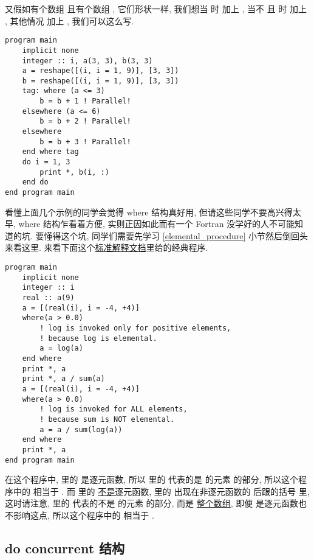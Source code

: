 又假如有个数组  且有个数组 , 它们形状一样, 我们想当  时  加上 , 当不  且  时  加上 , 其他情况  加上 , 我们可以这么写.
\begin{lstlisting}
program main
    implicit none
    integer :: i, a(3, 3), b(3, 3)
    a = reshape([(i, i = 1, 9)], [3, 3])
    b = reshape([(i, i = 1, 9)], [3, 3])
    tag: where (a <= 3)
        b = b + 1 ! Parallel!
    elsewhere (a <= 6)
        b = b + 2 ! Parallel!
    elsewhere
        b = b + 3 ! Parallel!
    end where tag
    do i = 1, 3
        print *, b(i, :)
    end do
end program main
\end{lstlisting}

看懂上面几个示例的同学会觉得 where 结构真好用, 但请这些同学不要高兴得太早, where 结构乍看着方便, 实则正因如此而有一个 Fortran 没学好的人不可能知道的坑. 要懂得这个坑, 同学们需要先学习 \ref{elemental_procedure} 小节然后倒回头来看这里. 来看下面这个\href{https://j3-fortran.org/doc/year/24/24-007.pdf}{标准解释文档}里给的经典程序.
\begin{lstlisting}
program main
    implicit none
    integer :: i
    real :: a(9)
    a = [(real(i), i = -4, +4)]
    where(a > 0.0)
        ! log is invoked only for positive elements,
        ! because log is elemental.
        a = log(a) 
    end where
    print *, a
    print *, a / sum(a)
    a = [(real(i), i = -4, +4)]
    where(a > 0.0)
        ! log is invoked for ALL elements,
        ! because sum is NOT elemental.
        a = a / sum(log(a)) 
    end where
    print *, a
end program main
\end{lstlisting}
在这个程序中,  里的  是逐元函数, 所以  里的  代表的是  的元素  的部分, 所以这个程序中的  相当于 . 而  里的  \uline{不是}逐元函数,  里的  出现在非逐元函数的  后跟的括号 \ttt{()} 里, 这时请注意,  里的  代表的不是  的元素  的部分, 而是  \uline{整个数组}, 即便  是逐元函数也不影响这点, 所以这个程序中的  相当于 .

\subsection[do concurrent\\结构]{do concurrent 结构}

